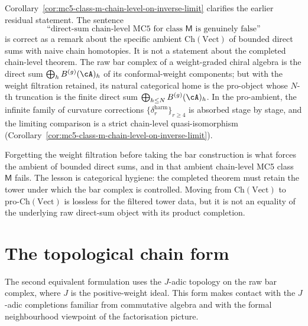 \begin{remark}
\label{rem:direct-sum-obstruction-is-ambient-choice}
Corollary~\textup{\ref{cor:mc5-class-m-chain-level-on-inverse-limit}}
clarifies the earlier residual statement. The sentence
\[
\text{``direct-sum chain-level MC5 for class $\mathsf{M}$ is genuinely false''}
\]
is correct as a remark about the specific ambient $\mathrm{Ch}(\mathrm{Vect})$
of bounded direct sums with naive chain homotopies. It is not a statement
about the completed chain-level theorem. The raw
bar complex of a weight-graded chiral algebra is the direct sum
$\bigoplus_h B^{(g)}(\cA)_h$ of its conformal-weight components; but
with the weight filtration retained, its natural categorical home is
the pro-object whose $N$-th truncation is the finite direct sum
$\bigoplus_{h \leq N} B^{(g)}(\cA)_h$. In the pro-ambient, the infinite
family of curvature corrections $\{\delta_r^{\mathrm{harm}}\}_{r \geq 4}$
is absorbed stage by stage, and the limiting comparison is a strict
chain-level quasi-isomorphism
\textup{(}Corollary~\textup{\ref{cor:mc5-class-m-chain-level-on-inverse-limit}}\textup{)}.

Forgetting the weight filtration before taking the bar construction is
what forces the ambient of bounded direct sums, and in that ambient
chain-level MC5 class $\mathsf{M}$ fails. The lesson is categorical
hygiene: the completed theorem must retain the tower under which the
bar complex is controlled. Moving from $\mathrm{Ch}(\mathrm{Vect})$ to
$\mathrm{pro}\text{-}\mathrm{Ch}(\mathrm{Vect})$ is lossless for the
filtered tower data, but it is not an equality of the underlying raw
direct-sum object with its product completion.
\end{remark}

\section{The topological chain form}
\label{sec:mc5-j-adic}

The second equivalent formulation uses the $J$-adic topology on the raw
bar complex, where $J$ is the positive-weight ideal. This form makes
contact with the $J$-adic completions familiar from commutative algebra
and with the formal neighbourhood viewpoint of the factorisation
picture.

